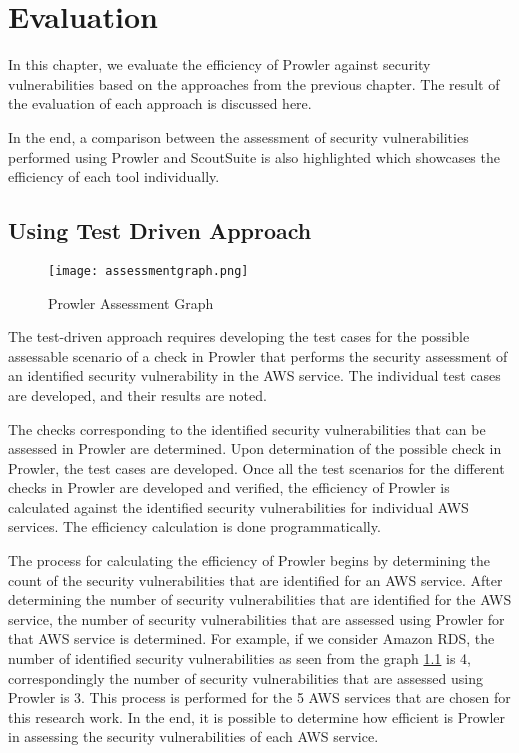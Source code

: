 
\chapter{Evaluation}

\par In this chapter, we evaluate the efficiency of Prowler against security vulnerabilities based on the approaches from the previous chapter. The result of the evaluation of each approach is discussed here.

\par In the end, a comparison between the assessment of security vulnerabilities performed using Prowler and
ScoutSuite is also highlighted which showcases the efficiency of each tool individually.

\section{Using Test Driven Approach}
\begin{figure}
    \centering
    \texttt{[image: assessmentgraph.png]}
    \caption{Prowler Assessment Graph}
    \label{fig:prowlerefficiency}
\end{figure}

\par The test-driven approach requires developing the test cases for the possible assessable scenario of a check in Prowler that performs the security assessment of an identified security vulnerability in the AWS service. The individual test cases are developed, and their results are noted.

\par The checks corresponding to the identified security vulnerabilities that can be assessed in Prowler are determined. Upon determination of the possible check in Prowler, the test cases are developed. Once all the test scenarios for the different checks in Prowler are developed and verified, the efficiency of Prowler is calculated against the identified security vulnerabilities for individual AWS services. The efficiency calculation is done programmatically.

\par The process for calculating the efficiency of Prowler begins by determining the count of the security
vulnerabilities that are identified for an AWS service. After determining the number of security vulnerabilities that
are identified for the AWS service, the number of security vulnerabilities that are assessed using Prowler for that AWS service is determined. For example, if we consider Amazon RDS, the number of identified security vulnerabilities as seen from the graph \ref{fig:prowlerefficiency} is 4, correspondingly the number of security vulnerabilities that are assessed using Prowler is 3. This process is performed for the 5 AWS services that are chosen for this research work. In the end, it is possible to determine how efficient is Prowler in assessing the security vulnerabilities of each AWS service.

